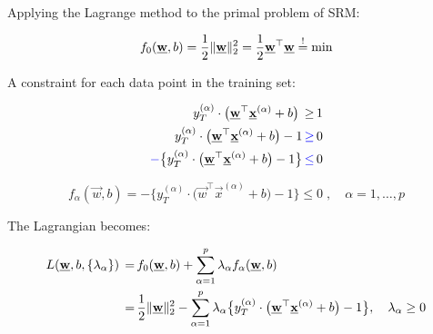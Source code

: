 \begin{frame}
Applying the Lagrange method to the primal problem of SRM:

\begin{equation}
f_{0}(\vec w,b) = \frac{1}{2} \lVert \vec w \rVert_{2}^{2} = \frac{1}{2} \vec w^{\top} \vec w \eqexcl \min
\end{equation}

A constraint for each data point in the training set:

\pause

\slidesonly{\vspace{-3mm}}

\begin{align}
 y_{T}^{(\alpha)} \cdot \big( \vec w^{\top} \vec x^{(\alpha)} + b \big) \,\ge\, &1\\
 y_{T}^{(\alpha)} \cdot \big( \vec w^{\top} \vec x^{(\alpha)} + b \big) -1 \,{\color{blue}\ge}\, &0\\
 {\color{blue}-}\big\{y_{T}^{(\alpha)} \cdot \big( \vec w^{\top} \vec x^{(\alpha)} + b \big) -1\big\} \,{\color{blue}\le}\, &0
\end{align}

\begin{equation}
f_{\alpha} (\vec w,b) = -\big\{ y_{T}^{(\alpha)} \cdot \big( \vec w^{\top} \vec x^{(\alpha)} + b \big) -1 \big\} \le 0\;,\quad \alpha = 1,\ldots,p    
\end{equation}

The Lagrangian becomes:

\pause

\slidesonly{\vspace{-5mm}}

\begin{align}
L(\vec w, b, \{\lambda_{\alpha}\}) 
\,=&\, f_{0}(\vec w,b) + \sum_{\alpha=1}^{p} \lambda_{\alpha} f_{\alpha}(\vec w,b)\\
\,=&\, \frac{1}{2} \lVert \vec w \rVert_{2}^{2}
- \sum_{\alpha=1}^{p} \lambda_{\alpha} \big\{ y_{T}^{(\alpha)} \cdot \big( \vec w^{\top} \vec x^{(\alpha)} + b \big) -1 \big\}
\label{eq:lagrangianprimal}\slidesonly{,\quad \lambda_{\alpha} \ge 0}
\end{align}

\end{frame}

